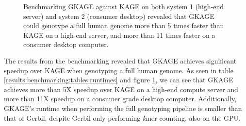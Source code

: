 %
\begin{figure}[H]
\centering
\caption{
  Benchmarking GKAGE against KAGE on both system 1 (high-end server) and system 2 (consumer desktop) revealed that GKAGE could genotype a full human genome more than 5 times faster than KAGE on a high-end server, and more than 11 times faster on a consumer desktop computer.
}
\label{results:benchmarking:figures:runtimes}
\end{figure}
%

The results from the benchmarking revealed that GKAGE achieves significant speedup over KAGE when genotyping a full human genome.
As seen in table \ref{results:benchmarking:tables:runtimes} and figure \ref{results:benchmarking:figures:runtimes}, we can see that GKAGE achieves more than 5X speedup over KAGE on a high-end compute server and more than 11X speedup on a consumer grade desktop computer.
Additionally, GKAGE's runtime when performing the full genotyping pipeline is smaller than that of Gerbil, despite Gerbil only performing \textit{k}mer counting, also on the GPU.

